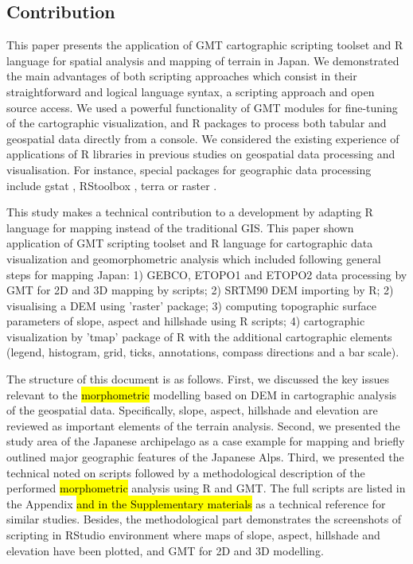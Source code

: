 \documentclass[land,article,submit,pdftex,moreauthors]{Definitions/mdpi}
\begin{document}
\subsection{Contribution}

This paper presents the application of GMT cartographic scripting toolset \cite{Wesseletal2019} and R language \cite{RCoreTeam} for spatial analysis and mapping of terrain in Japan. We demonstrated the main advantages of both scripting approaches which consist in their straightforward and logical language syntax, a scripting approach and open source access. We used a powerful functionality of GMT modules for fine-tuning of the cartographic visualization, and R packages to process both tabular and geospatial data directly from a console. We considered the existing experience of applications of R libraries in previous studies on geospatial data processing and visualisation. For instance, special packages for geographic data processing include gstat \cite{HENGL20081886}, RStoolbox \cite{app122412554}, terra or raster \cite{jimaging8120317}.

This study makes a technical contribution to a development by adapting R language for mapping instead of the traditional GIS. This paper shown application of GMT scripting toolset and R language for cartographic data visualization and geomorphometric analysis which included following general steps for mapping Japan: 1) GEBCO, ETOPO1 and ETOPO2 data processing by GMT for 2D and 3D mapping by scripts; 2) SRTM90 DEM importing by R; 2) visualising a DEM using 'raster' package; 3) computing topographic surface parameters of slope, aspect and hillshade using R scripts; 4) cartographic visualization by 'tmap' package of R with the additional cartographic elements (legend, histogram, grid, ticks, annotations, compass directions and a bar scale). 

The structure of this document is as follows. First, we discussed the key issues relevant to the \hl{morphometric} modelling based on DEM in cartographic analysis of the geospatial data. Specifically, slope, aspect, hillshade and elevation are reviewed as important elements of the terrain analysis. Second, we presented the study area of the Japanese archipelago as a case example for mapping and briefly outlined major geographic features of the Japanese Alps. Third, we presented the technical noted on scripts followed by a methodological description of the performed \hl{morphometric} analysis using R and GMT. The full scripts are listed in the Appendix \hl{and in the Supplementary materials} as a technical reference for similar studies. Besides, the methodological part demonstrates the screenshots of scripting in RStudio environment where maps of slope, aspect, hillshade and elevation have been plotted, and GMT for 2D and 3D modelling. 
\end{document}
